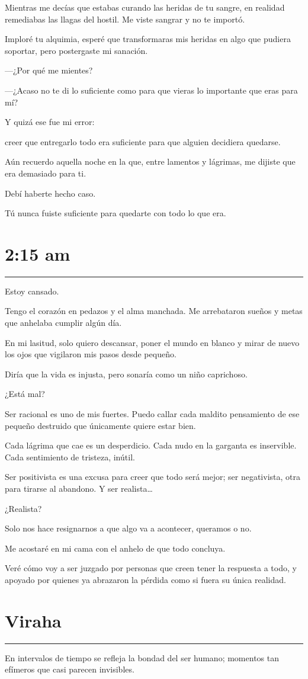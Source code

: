 \documentclass[12pt,oneside,a5paper]{book}
\newcommand{\poema}[1]{
    \clearpage
    \section*{#1}
    \vspace{-0.5em}
    {\color{black}\rule{\textwidth}{0.4pt}} \par \vspace{0.8em}
    \addcontentsline{toc}{section}{#1}
}
\begin{document}
Mientras me decías que estabas curando las heridas de tu sangre, en realidad remediabas las llagas del hostil.
Me viste sangrar y no te importó.

Imploré tu alquimia, esperé que transformaras mis heridas en algo que pudiera soportar, pero postergaste mi sanación.

—¿Por qué me mientes?

—¿Acaso no te di lo suficiente como para que vieras lo importante que eras para mí?

Y quizá ese fue mi error:

creer que entregarlo todo era suficiente para que alguien decidiera quedarse.

Aún recuerdo aquella noche en la que, entre lamentos y lágrimas, me dijiste que era demasiado para ti.

Debí haberte hecho caso.

Tú nunca fuiste suficiente para quedarte con todo lo que era.


\poema{2:15 am}
Estoy cansado.

Tengo el corazón en pedazos y el alma manchada. Me arrebataron sueños y metas que anhelaba cumplir algún día.

En mi lasitud, solo quiero descansar, poner el mundo en blanco y mirar de nuevo los ojos que vigilaron mis pasos desde pequeño.

Diría que la vida es injusta, pero sonaría como un niño caprichoso.

¿Está mal?

Ser racional es uno de mis fuertes. Puedo callar cada maldito pensamiento de ese pequeño destruido que únicamente quiere estar bien.

Cada lágrima que cae es un desperdicio. Cada nudo en la garganta es inservible. Cada sentimiento de tristeza, inútil.

Ser positivista es una excusa para creer que todo será mejor; ser negativista, otra para tirarse al abandono.
Y ser realista…

¿Realista?

Solo nos hace resignarnos a que algo va a acontecer, queramos o no.

Me acostaré en mi cama con el anhelo de que todo concluya.

Veré cómo voy a ser juzgado por personas que creen tener la respuesta a todo, y apoyado por quienes ya abrazaron la pérdida como si fuera su única realidad.


\poema{Viraha}
En intervalos de tiempo se refleja la bondad del ser humano; momentos tan efímeros que casi parecen invisibles.
\end{document}
